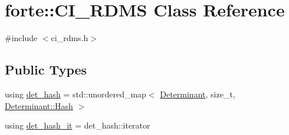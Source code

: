 \hypertarget{classforte_1_1_c_i___r_d_m_s}{}\section{forte\+:\+:C\+I\+\_\+\+R\+D\+MS Class Reference}
\label{classforte_1_1_c_i___r_d_m_s}


{\ttfamily \#include $<$ci\+\_\+rdms.\+h$>$}

\subsection*{Public Types}
\begin{DoxyCompactItemize}
\item 
using \mbox{\hyperlink{classforte_1_1_c_i___r_d_m_s_a6fe09e4dcfafed624c05462004a9de51}{det\+\_\+hash}} = std\+::unordered\+\_\+map$<$ \mbox{\hyperlink{namespaceforte_a2076c63fd7b8732004d9e1442ce527c1}{Determinant}}, size\+\_\+t, \mbox{\hyperlink{structforte_1_1_bit_array_1_1_hash}{Determinant\+::\+Hash}} $>$
\item 
using \mbox{\hyperlink{classforte_1_1_c_i___r_d_m_s_a848538093346b3724b92d39fbbaee36a}{det\+\_\+hash\+\_\+it}} = det\+\_\+hash\+::iterator
\end{DoxyCompactItemize}
